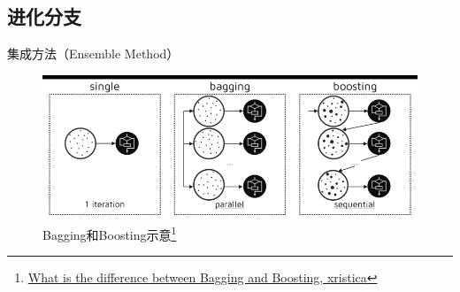 \subsection{进化分支}
\begin{frame}{集成方法（Ensemble Method）}
    \begin{figure}[!tb]
        \includegraphics[width=.8\linewidth]{figure/decision_tree/bag_boost}
        \caption{Bagging和Boosting示意\footnote{
                 \href{http://quantdare.com/2016/04/what-is-the-difference-between-bagging-and-boosting/}{What is the difference between Bagging and Boosting, xristica}}}
    \end{figure}
\end{frame}

